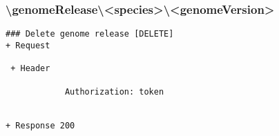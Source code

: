 \subsubsection*{\textbackslash genomeRelease\textbackslash <species>\textbackslash <genomeVersion>}
\begin{verbatim}
### Delete genome release [DELETE]
+ Request 
    
 + Header
    
            Authorization: token


+ Response 200
\end{verbatim}
